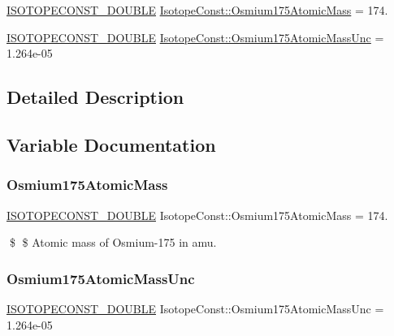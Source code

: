 \begin{DoxyCompactItemize}
\item 
\mbox{\hyperlink{group___isotope_const-_macros_ga8f45a7272ce02c0b4c65c44636ed719a}{I\+S\+O\+T\+O\+P\+E\+C\+O\+N\+S\+T\+\_\+\+D\+O\+U\+B\+LE}} \mbox{\hyperlink{group___isotope_const-_osmium-_os175_ga9af2a0443948860329071f90cd36a297}{Isotope\+Const\+::\+Osmium175\+Atomic\+Mass}} = 174.
\item 
\mbox{\hyperlink{group___isotope_const-_macros_ga8f45a7272ce02c0b4c65c44636ed719a}{I\+S\+O\+T\+O\+P\+E\+C\+O\+N\+S\+T\+\_\+\+D\+O\+U\+B\+LE}} \mbox{\hyperlink{group___isotope_const-_osmium-_os175_ga1e23d01ebff7d5fd94f6ab3b568060a0}{Isotope\+Const\+::\+Osmium175\+Atomic\+Mass\+Unc}} = 1.\+264e-\/05
\end{DoxyCompactItemize}


\subsection{Detailed Description}


\subsection{Variable Documentation}
\mbox{\label{group___isotope_const-_osmium-_os175_ga9af2a0443948860329071f90cd36a297}} 
\subsubsection{\texorpdfstring{Osmium175\+Atomic\+Mass}{Osmium175AtomicMass}}
{\footnotesize\ttfamily \mbox{\hyperlink{group___isotope_const-_macros_ga8f45a7272ce02c0b4c65c44636ed719a}{I\+S\+O\+T\+O\+P\+E\+C\+O\+N\+S\+T\+\_\+\+D\+O\+U\+B\+LE}} Isotope\+Const\+::\+Osmium175\+Atomic\+Mass = 174.}

\$ \$ Atomic mass of Osmium-\/175 in amu. \mbox{\label{group___isotope_const-_osmium-_os175_ga1e23d01ebff7d5fd94f6ab3b568060a0}} 
\subsubsection{\texorpdfstring{Osmium175\+Atomic\+Mass\+Unc}{Osmium175AtomicMassUnc}}
{\footnotesize\ttfamily \mbox{\hyperlink{group___isotope_const-_macros_ga8f45a7272ce02c0b4c65c44636ed719a}{I\+S\+O\+T\+O\+P\+E\+C\+O\+N\+S\+T\+\_\+\+D\+O\+U\+B\+LE}} Isotope\+Const\+::\+Osmium175\+Atomic\+Mass\+Unc = 1.\+264e-\/05}

